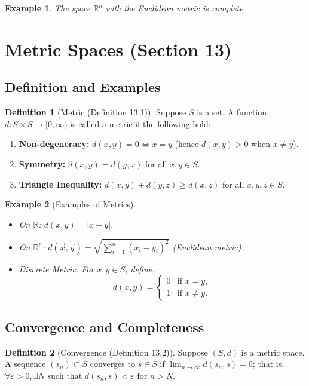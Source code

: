 \documentclass[9pt]{article}
\theoremstyle{definition}
\newtheorem{definition}{Definition}
\theoremstyle{plain}
\newtheorem{example}{Example}
\begin{document}
\begin{example}
The space \( \mathbb{R}^n \) with the Euclidean metric is complete.
\end{example}
\section*{Metric Spaces (Section 13)}

\subsection*{Definition and Examples}
\begin{definition}[Metric (Definition 13.1)]
Suppose \( S \) is a set. A function \( d : S \times S \to [0, \infty) \) is called a metric if the following hold:
\begin{enumerate}[label=(D\arabic*)]
    \item \textbf{Non-degeneracy:} \( d(x, y) = 0 \iff x = y \) (hence \( d(x, y) > 0 \) when \( x \neq y \)).
    \item \textbf{Symmetry:} \( d(x, y) = d(y, x) \) for all \( x, y \in S \).
    \item \textbf{Triangle Inequality:} \( d(x, y) + d(y, z) \geq d(x, z) \) for all \( x, y, z \in S \).
\end{enumerate}
\end{definition}

\begin{example}[Examples of Metrics]
\leavevmode
\begin{itemize}
    \item On \( \mathbb{R} \): \( d(x, y) = |x - y| \).
    \item On \( \mathbb{R}^n \): \( d(\vec{x}, \vec{y}) = \sqrt{\sum_{i=1}^n (x_i - y_i)^2} \) (Euclidean metric).
    \item Discrete Metric: For \( x, y \in S \), define:
    \[
    d(x, y) = 
    \begin{cases} 
    0 & \text{if } x = y, \\
    1 & \text{if } x \neq y.
    \end{cases}
    \]
\end{itemize}
\end{example}

\subsection*{Convergence and Completeness}
\begin{definition}[Convergence (Definition 13.2)]
Suppose \( (S, d) \) is a metric space. A sequence \( (s_n) \subset S \) converges to \( s \in S \) if \( \lim_{n \to \infty} d(s_n, s) = 0 \); that is, \( \forall \varepsilon > 0, \exists N \text{ such that } d(s_n, s) < \varepsilon \text{ for } n > N \).
\end{definition}
\end{document}
